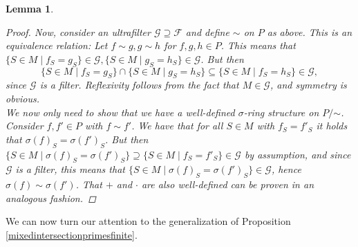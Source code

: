 \documentclass{article}
\def\s{\sigma}
\newcommand{\textsim}{\mathord{\sim}}
\theoremstyle{plain}
\newtheorem{lem}[Satz]{Lemma}
\theoremstyle{definition}
\begin{document}
\begin{lem}
\begin{proof}
 Now, consider an ultrafilter $\mathcal{G} \supseteq \mathcal{F}$ and define $\sim$ on $P$ as above. This is an equivalence relation: Let $f \sim g, g \sim h$ for $f,g,h \in P$. 
 This means that $\{ S \in M \mid f_S = g_S \} \in \mathcal{G}, \{ S \in M \mid g_S = h_S \} \in \mathcal{G}$. But then $$\{ S \in M \mid f_S = g_S \} \cap \{ S \in M \mid g_S = h_S \} \subseteq \{ S \in M \mid f_S = h_S \} \in \mathcal{G},$$
 since $\mathcal{G}$ is a filter.
 Reflexivity follows from the fact that $M \in \mathcal{G}$, and symmetry is obvious. \\
\indent  We now only need to show that we have a well-defined $\s$-ring structure on $P/\textsim$.
 Consider $f,f' \in P$ with $f \sim f'$. We have that for all $S \in M$ with $f_S = f'_S$ it holds that $\sigma(f)_S = \sigma(f')_S$. 
 But then $\{ S \in M \mid \s(f)_S = \s(f')_S \} \supseteq \{ S \in M \mid f_S = f'_S \} \in \mathcal{G}$ by assumption, and since $\mathcal{G}$ is a filter, this means that $\{ S \in M \mid \s(f)_S = \s(f')_S \} \in \mathcal{G}$,
 hence $\s(f) \sim \s(f')$. That $+$ and $\cdot$ are also well-defined can be proven in an analogous fashion.
\end{proof}
\end{lem}

We can now turn our attention to the generalization of Proposition \ref{mixedintersectionprimesfinite}. 
\end{document}
